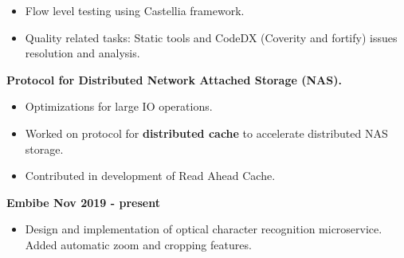 \begin{itemize}
\begin{itemize}
	 \item Flow level testing using Castellia framework.\\[-0.5cm]
	 \item Quality related tasks: Static tools and CodeDX (Coverity and fortify) issues resolution and analysis.\\[-0.5cm]
	\end{itemize}
	\textbf{Protocol for Distributed Network Attached Storage (NAS).}\\[-0.6cm]
	\begin{itemize}
	\item Optimizations for large IO operations.\\[-0.5cm]
	\item Worked on protocol for \textbf{distributed cache} to accelerate distributed NAS storage.\\[-0.5cm]
	\item Contributed in development of Read Ahead Cache.
	\end{itemize}
	
\end{itemize}
\textbf{Embibe Nov 2019 - present}
\begin{itemize}
	\item Design and implementation of optical character recognition microservice. Added automatic zoom and cropping features.
\end{itemize}
